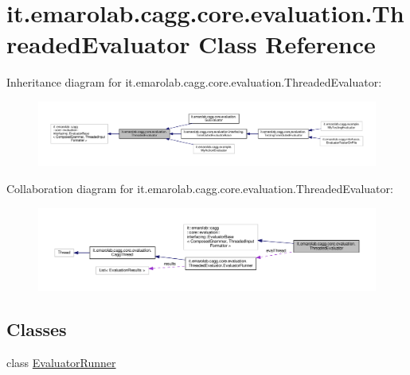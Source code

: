 \hypertarget{classit_1_1emarolab_1_1cagg_1_1core_1_1evaluation_1_1ThreadedEvaluator}{\section{it.\-emarolab.\-cagg.\-core.\-evaluation.\-Threaded\-Evaluator Class Reference}
\label{classit_1_1emarolab_1_1cagg_1_1core_1_1evaluation_1_1ThreadedEvaluator}
}


Inheritance diagram for it.\-emarolab.\-cagg.\-core.\-evaluation.\-Threaded\-Evaluator\-:\nopagebreak
\begin{figure}[H]
\begin{center}
\leavevmode
\includegraphics[width=350pt]{classit_1_1emarolab_1_1cagg_1_1core_1_1evaluation_1_1ThreadedEvaluator__inherit__graph}
\end{center}
\end{figure}


Collaboration diagram for it.\-emarolab.\-cagg.\-core.\-evaluation.\-Threaded\-Evaluator\-:\nopagebreak
\begin{figure}[H]
\begin{center}
\leavevmode
\includegraphics[width=350pt]{classit_1_1emarolab_1_1cagg_1_1core_1_1evaluation_1_1ThreadedEvaluator__coll__graph}
\end{center}
\end{figure}
\subsection*{Classes}
\begin{DoxyCompactItemize}
\item 
class \hyperlink{classit_1_1emarolab_1_1cagg_1_1core_1_1evaluation_1_1ThreadedEvaluator_1_1EvaluatorRunner}{Evaluator\-Runner}
\end{DoxyCompactItemize}
